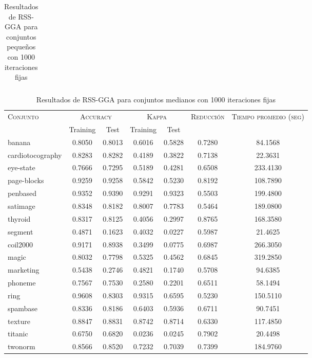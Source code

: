 \begin{table}[]
\begin{tabular}{l c c c c c c}
\hline
\end{tabular}
\caption{Resultados de RSS-GGA para conjuntos pequeños con 1000 iteraciones fijas}
\label{res-peq-rss-gga}
\end{table}



\begin{table}[]
\centering
\begin{tabular}{l c c c c c c}
\hline
\multirow{2}{*}{\textsc{Conjunto}}
	& \multicolumn{2}{c}{\textsc{Accuracy}}
	& \multicolumn{2}{c}{\textsc{Kappa}}
	& \textsc{Reducción}
	& \textsc{Tiempo promedio (seg)} \\
	& Training & Test
	& Training & Test \\ 
\hline
\hline

banana & 0.8050 & 0.8013 & 0.6016 & 0.5828 & 0.7280 & 84.1568 \\
cardiotocography & 0.8283 & 0.8282 & 0.4189 & 0.3822 & 0.7138 & 22.3631 \\
eye-state & 0.7666 & 0.7295 & 0.5189 & 0.4281 & 0.6508 & 233.4130 \\
page-blocks & 0.9259 & 0.9258 & 0.5842 & 0.5230 & 0.8192 & 108.7890 \\
penbased & 0.9352 & 0.9390 & 0.9291 & 0.9323 & 0.5503 & 199.4800 \\
satimage & 0.8348 & 0.8182 & 0.8007 & 0.7783 & 0.5464 & 189.0800 \\
thyroid & 0.8317 & 0.8125 & 0.4056 & 0.2997 & 0.8765 & 168.3580 \\
segment & 0.4871 & 0.1623 & 0.4032 & 0.0227 & 0.5987 & 21.4625 \\
coil2000 & 0.9171 & 0.8938 & 0.3499 & 0.0775 & 0.6987 & 266.3050 \\
magic & 0.8032 & 0.7798 & 0.5325 & 0.4562 & 0.6845 & 319.2850 \\
marketing & 0.5438 & 0.2746 & 0.4821 & 0.1740 & 0.5708 & 94.6385 \\
phoneme & 0.7567 & 0.7530 & 0.2580 & 0.2201 & 0.6511 & 58.1494 \\
ring & 0.9608 & 0.8303 & 0.9315 & 0.6595 & 0.5230 & 150.5110 \\
spambase & 0.8336 & 0.8186 & 0.6403 & 0.5936 & 0.6711 & 90.7451 \\
texture & 0.8847 & 0.8831 & 0.8742 & 0.8714 & 0.6330 & 117.4850 \\
titanic & 0.6750 & 0.6820 & 0.0236 & 0.0245 & 0.7902 & 20.4498 \\
twonorm & 0.8566 & 0.8520 & 0.7232 & 0.7039 & 0.7399 & 184.9760 \\

\hline
\end{tabular}
\caption{Resultados de RSS-GGA para conjuntos medianos con 1000 iteraciones fijas}
\label{res-med-rss-gga}
\end{table}



